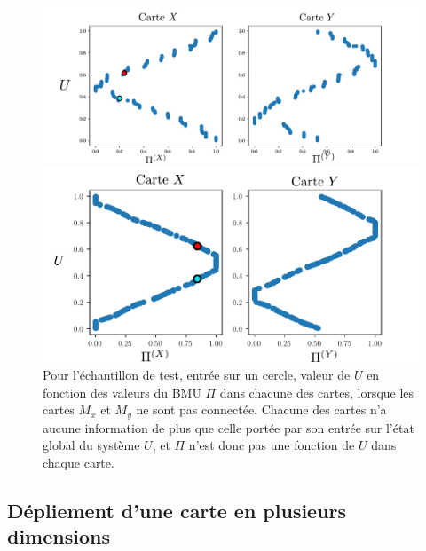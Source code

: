 \begin{figure}
\begin{minipage}{0.45\textwidth}
\includegraphics[width = \textwidth]{XU_YU.pdf}
\caption{Valeur de $U$ en fonction des valeurs du BMU $\Pi$ dans chacune des cartes. On voit que $U$ est une fonction de la position du BMU dans chaque carte, contrairement au cas ou les cartes apprendraient indépendamment sur les mêmes entrées, voir figure \ref{fig:piu_indep}.}
\label{fig:piu}
\end{minipage}
\hfill
\begin{minipage}{0.45\textwidth}
\centering
\includegraphics[width = \textwidth]{xu_yu_unco.pdf}
\caption{Pour l'échantillon de test, entrée sur un cercle, valeur de $U$ en fonction des valeurs du BMU $\Pi$ dans chacune des cartes, lorsque les cartes $M_x$ et $M_y$ ne sont pas connectée. Chacune des cartes n'a aucune information de plus que celle portée par son entrée sur l'état global du système $U$, et $\Pi$ n'est donc pas une fonction de $U$ dans chaque carte. }
\label{fig:piu_indep}
\end{minipage}

\end{figure}


\subsection{Dépliement d'une carte en plusieurs dimensions}

